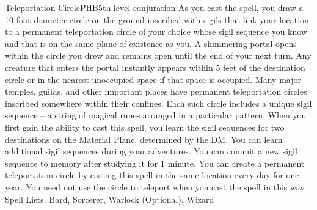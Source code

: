 \begin{spell}{Teleportation Circle}{PHB}{5th-level conjuration}
{
}
As you cast the spell, you draw a 10-foot-diameter circle on the ground inscribed with sigils that link your location to a permanent teleportation circle of your choice whose sigil sequence you know and that is on the same plane of existence as you.
A shimmering portal opens within the circle you drew and remains open until the end of your next turn. Any creature that enters the portal instantly appears within 5 feet of the destination circle or in the nearest unoccupied space if that space is occupied.
Many major temples, guilds, and other important places have permanent teleportation circles inscribed somewhere within their confines. Each such circle includes a unique sigil sequence – a string of magical runes arranged in a particular pattern. When you first gain the ability to cast this spell, you learn the sigil sequences for two destinations on the Material Plane, determined by the DM. You can learn additional sigil sequences during your adventures. You can commit a new sigil sequence to memory after studying it for 1 minute.
You can create a permanent teleportation circle by casting this spell in the same location every day for one year. You need not use the circle to teleport when you cast the spell in this way.
Spell Lists. Bard, Sorcerer, Warlock (Optional), Wizard
\end{spell}

